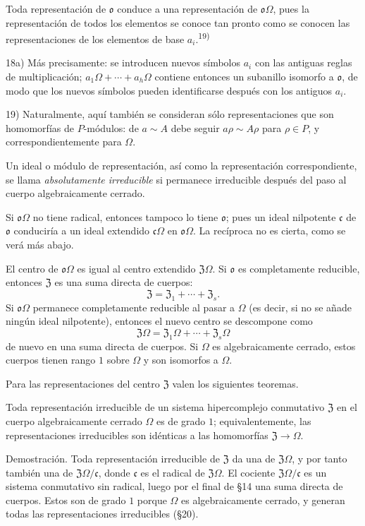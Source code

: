 \documentclass[11pt]{article}
\providecommand{\mo}{\mathfrak{o}}
\providecommand{\mc}{\mathfrak{c}}
\providecommand{\mZ}{\mathfrak{Z}}
\begin{document}
Toda representación de $\mo$ conduce a una representación de $\mo\Omega$, pues la representación de todos los elementos se conoce tan pronto como se conocen las representaciones de los elementos de base $a_i$.\textsuperscript{19)}

{\footnotesize\noindent 18a) Más precisamente: se introducen nuevos símbolos $a_i$ con las antiguas reglas de multiplicación; $a_1\Omega+\cdots+a_h\Omega$ contiene entonces un subanillo isomorfo a $\mo$, de modo que los nuevos símbolos pueden identificarse después con los antiguos $a_i$.\par
19) Naturalmente, aquí también se consideran sólo representaciones que son homomorfías de $P$-módulos: de $a\sim A$ debe seguir $a\rho\sim A\rho$ para $\rho\in P$, y correspondientemente para $\Omega$.\par}

Un ideal o módulo de representación, así como la representación correspondiente, se llama \emph{absolutamente irreducible} si permanece irreducible después del paso al cuerpo algebraicamente cerrado.

Si $\mo\Omega$ no tiene radical, entonces tampoco lo tiene $\mo$; pues un ideal nilpotente $\mc$ de $\mo$ conduciría a un ideal extendido $\mc\Omega$ en $\mo\Omega$. La recíproca no es cierta, como se verá más abajo.

El centro de $\mo\Omega$ es igual al centro extendido $\mZ\Omega$. Si $\mo$ es completamente reducible, entonces $\mZ$ es una suma directa de cuerpos:
\[
        \mZ=\mZ_1+\cdots+\mZ_s.
\]
Si $\mo\Omega$ permanece completamente reducible al pasar a $\Omega$ (es decir, si no se añade ningún ideal nilpotente), entonces el nuevo centro se descompone como
\[
        \mZ\Omega=\mZ_1\Omega+\cdots+\mZ_s\Omega
\]
de nuevo en una suma directa de cuerpos. Si $\Omega$ es algebraicamente cerrado, estos cuerpos tienen rango $1$ sobre $\Omega$ y son isomorfos a $\Omega$.

Para las representaciones del centro $\mZ$ valen los siguientes teoremas.

Toda representación irreducible de un sistema hipercomplejo conmutativo $\mZ$ en el cuerpo algebraicamente cerrado $\Omega$ es de grado $1$; equivalentemente, las representaciones irreducibles son idénticas a las homomorfías $\mZ\to\Omega$.

Demostración. Toda representación irreducible de $\mZ$ da una de $\mZ\Omega$, y por tanto también una de $\mZ\Omega/\mc$, donde $\mc$ es el radical de $\mZ\Omega$. El cociente $\mZ\Omega/\mc$ es un sistema conmutativo sin radical, luego por el final de §14 una suma directa de cuerpos. Estos son de grado $1$ porque $\Omega$ es algebraicamente cerrado, y generan todas las representaciones irreducibles (§20).
\end{document}
